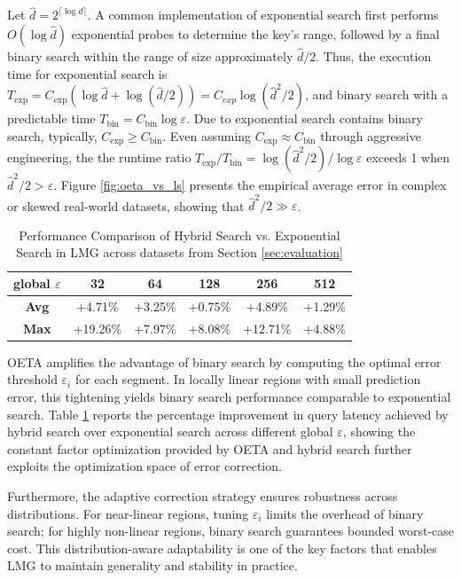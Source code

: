 Let $\hat{d} = 2^{\lceil \log d \rceil}$. A common implementation of exponential search first performs $O(\log \hat{d})$ exponential probes to determine the key's range, followed by a final binary search within the range of size approximately $\hat{d}/2$. Thus, the execution time for exponential search is $T_{\text{exp}} = C_{\text{exp}}(\log \hat{d} + \log (\hat{d}/2)) = C_{exp}\log (\hat{d}^2 / 2)$, and binary search with a predictable time $T_{\text{bin}} = C_{\text{bin}} \log \varepsilon$. Due to exponential search contains binary search, typically, $C_{\text{exp}} \geq C_{\text{bin}}$. Even assuming $C_\text{exp} \approx C_{\text{bin}}$ through aggressive engineering, the the runtime ratio $T_{\text{exp}}/T_{\text{bin}} = \log(\hat{d}^2/2)/\log\varepsilon$ exceeds 1 when $\hat{d}^2/2 > \varepsilon$. Figure \ref{fig:oeta_vs_ls} presents the empirical average error in complex or skewed real-world datasets, showing that $\hat{d}^2/2 \gg \varepsilon$.
\begin{table}
  \caption{Performance Comparison of Hybrid Search vs. Exponential Search in LMG across datasets from Section \ref{sec:evaluation}}
  \label{tab:hs_vs_es}
  \begin{tabular}{cccccc}
    \toprule
     \textbf{global $\varepsilon$}&32&64&128&256&512\\
    \midrule
    \textbf{Avg} & +4.71\% & +3.25\%& +0.75\%& +4.89\%&+1.29\%\\
    \textbf{Max} & +19.26\%& +7.97\%& +8.08\%& +12.71\%& +4.88\%\\
  \bottomrule
\end{tabular}
\end{table}

OETA amplifies the advantage of binary search by computing the optimal error threshold $\varepsilon_i$ for each segment. In locally linear regions with small prediction error, this tightening yields binary search performance comparable to exponential search. Table \ref{tab:hs_vs_es} reports the percentage improvement in query latency achieved by hybrid search over exponential search across different global $\varepsilon$, showing the constant factor optimization provided by OETA and hybrid search further exploits the optimization space of error correction.

Furthermore, the adaptive correction strategy ensures robustness across distributions. For near-linear regions, tuning $\varepsilon_i$ limits the overhead of binary search; for highly non-linear regions, binary search guarantees bounded worst-case cost. This distribution-aware adaptability is one of the key factors that enables LMG to maintain generality and stability in practice.


